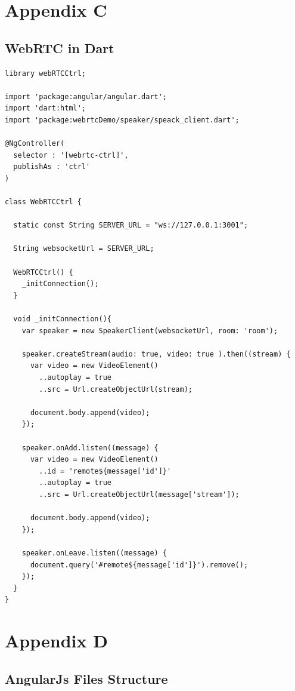 \begin{appendices}
\chapter{Appendix C}

\section{WebRTC in Dart} \label{research:dart_webrtcctrl}

\begin{lstlisting}[caption={WebRTCCtrl in Dart application client},label={code:dart_webrtcctrl}]
library webRTCCtrl;

import 'package:angular/angular.dart';
import 'dart:html';
import 'package:webrtcDemo/speaker/speack_client.dart';

@NgController(
  selector : '[webrtc-ctrl]',
  publishAs : 'ctrl'
)

class WebRTCCtrl {

  static const String SERVER_URL = "ws://127.0.0.1:3001";

  String websocketUrl = SERVER_URL;

  WebRTCCtrl() {
    _initConnection();
  }

  void _initConnection(){
    var speaker = new SpeakerClient(websocketUrl, room: 'room');

    speaker.createStream(audio: true, video: true ).then((stream) {
      var video = new VideoElement()
        ..autoplay = true
        ..src = Url.createObjectUrl(stream);

      document.body.append(video);
    });

    speaker.onAdd.listen((message) {
      var video = new VideoElement()
        ..id = 'remote${message['id']}'
        ..autoplay = true
        ..src = Url.createObjectUrl(message['stream']);

      document.body.append(video);
    });

    speaker.onLeave.listen((message) {
      document.query('#remote${message['id']}').remove();
    });
  }
}
\end{lstlisting}

\chapter{Appendix D}

\section{AngularJs Files Structure} \label{code:angularjs_structure}


\end{appendices}
